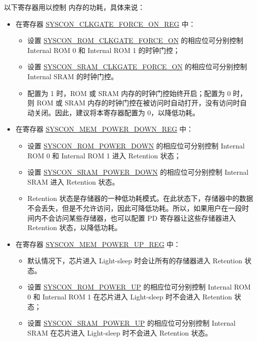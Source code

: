 \documentclass[main\_\_CN.tex]{subfiles}
\begin{document}
以下寄存器用以控制 \chipname{} 内存的功耗，具体来说：

\begin{itemize}
    \item 在寄存器 \hyperref[regdesc:SYSCONCLKGATEFORCEONREG]{SYSCON\_CLKGATE\_FORCE\_ON\_REG} 中：
    \begin{itemize}
        \item 设置 \hyperref[fielddesc:SYSCONROMCLKGATEFORCEON]{SYSCON\_ROM\_CLKGATE\_FORCE\_ON} 的相应位可分别控制 Internal ROM 0 和 Internal ROM 1 的时钟门控；
        \item 设置 \hyperref[fielddesc:SYSCONSRAMCLKGATEFORCEON]{SYSCON\_SRAM\_CLKGATE\_FORCE\_ON} 的相应位可分别控制 Internal SRAM 的时钟门控。
        \item 配置为 1 时，ROM 或 SRAM 内存的时钟门控始终开启；配置为 0 时，则 ROM 或 SRAM 内存的时钟门控在被访问时自动打开，没有访问时自动关闭。因此，建议将本寄存器配置为 0，以降低功耗。
    \end{itemize}
    \item 在寄存器 \hyperref[regdesc:SYSCONMEMPOWERDOWNREG]{SYSCON\_MEM\_POWER\_DOWN\_REG} 中：
    \begin{itemize}
        \item 设置 \hyperref[fielddesc:SYSCONROMPOWERDOWN]{SYSCON\_ROM\_POWER\_DOWN} 的相应位可分别控制 Internal ROM 0 和 Internal ROM 1 进入 Retention 状态；
        \item 设置 \hyperref[fielddesc:SYSCONSRAMPOWERDOWN]{SYSCON\_SRAM\_POWER\_DOWN} 的相应位可分别控制 Internal SRAM 进入 Retention 状态。
        \item Retention 状态是存储器的一种低功耗模式。在此状态下，存储器中的数据不会丢失，但是不允许访问，因此可降低功耗。所以，如果用户在一段时间内不会访问某些存储器，也可以配置 PD 寄存器让这些存储器进入 Retention 状态，以降低功耗。
    \end{itemize}
    \item 在寄存器 \hyperref[regdesc:SYSCONMEMPOWERUPREG]{SYSCON\_MEM\_POWER\_UP\_REG} 中：
    \begin{itemize}
        \item 默认情况下，芯片进入 Light-sleep 时会让所有的存储器进入 Retention 状态。
        \item 设置 \hyperref[fielddesc:SYSCONROMPOWERUP]{SYSCON\_ROM\_POWER\_UP} 的相应位可分别控制 Internal ROM 0 和 Internal ROM 1 在芯片进入 Light-sleep 时不会进入 Retention 状态；
        \item 设置 \hyperref[fielddesc:SYSCONSRAMPOWERUP]{SYSCON\_SRAM\_POWER\_UP} 的相应位可分别控制 Internal SRAM 在芯片进入 Light-sleep 时不会进入 Retention 状态。
    \end{itemize}
\end{itemize}
\end{document}
